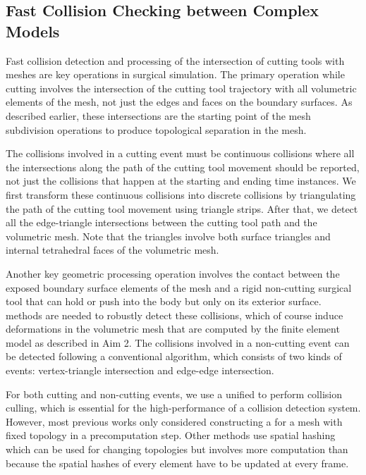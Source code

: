 \subsection{Fast Collision Checking between Complex Models}
Fast collision detection and processing of the intersection of cutting tools with meshes are key operations in surgical simulation. The primary operation while cutting involves the intersection of the cutting tool trajectory with all volumetric elements of the mesh, not just the edges and faces on the boundary surfaces. As described earlier, these intersections are the starting point of the mesh subdivision operations to produce topological separation in the mesh.

The collisions involved in a cutting event must be continuous collisions where all the intersections along the path of the cutting tool movement should be reported, not just the collisions that happen at the starting and ending time instances. We first transform these continuous collisions into discrete collisions by triangulating the path of the cutting tool movement using triangle strips. After that, we detect all the edge-triangle intersections between the cutting tool path and the volumetric mesh. Note that the triangles involve both surface triangles and internal tetrahedral faces of the volumetric mesh.

Another key geometric processing operation involves the contact between the exposed boundary surface elements of the mesh and a rigid non-cutting surgical tool that can hold or push into the body but only on its exterior surface.  methods are needed to robustly detect these collisions, which of course induce deformations in the volumetric mesh that are computed by the finite element model as described in Aim 2. The collisions involved in a non-cutting event can be detected following a conventional  algorithm, which consists of two kinds of events: vertex-triangle intersection and edge-edge intersection.

For both cutting and non-cutting events, we use a unified  to perform collision culling, which is essential for the high-performance of a collision detection system. However, most previous works only considered constructing a  for a mesh with fixed topology in a precomputation step. Other methods use spatial hashing which can be used for changing topologies but involves more computation than  because the spatial hashes of every element have to be updated at every frame.

